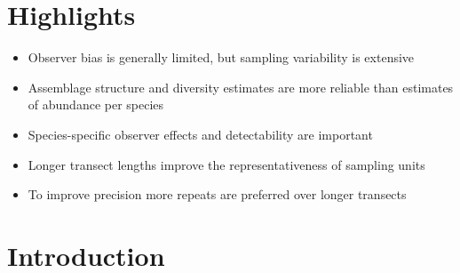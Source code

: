 \documentclass[10pt,letterpaper]{article}
\begin{document}
\section*{Highlights}
\begin{itemize}
   \item Observer bias is generally limited, but sampling variability is extensive
   \item Assemblage structure and diversity estimates are more reliable than estimates of abundance per species
   \item Species-specific observer effects and detectability are important
   \item Longer transect lengths improve the representativeness of sampling units
   \item To improve precision more repeats are preferred over longer transects 
\end{itemize}


\section{Introduction}
\label{intro}
\end{document}
